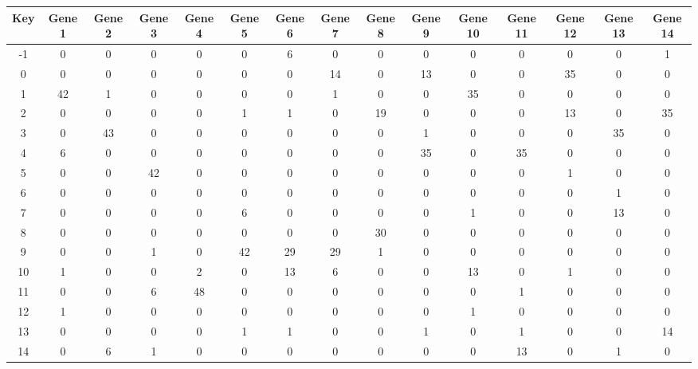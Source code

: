 \begin{tabular}{|c|c|c|c|c|c|c|c|c|c|c|c|c|c|c|}
\hline
Key & Gene 1 & Gene 2 & Gene 3 & Gene 4 & Gene 5 & Gene 6 & Gene 7 & Gene 8 & Gene 9 & Gene 10 & Gene 11 & Gene 12 & Gene 13 & Gene 14 \\
\hline
-1 & 0 & 0 & 0 & 0 & 0 & 6 & 0 & 0 & 0 & 0 & 0 & 0 & 0 & 1 \\
0 & 0 & 0 & 0 & 0 & 0 & 0 & 14 & 0 & 13 & 0 & 0 & 35 & 0 & 0 \\
1 & 42 & 1 & 0 & 0 & 0 & 0 & 1 & 0 & 0 & 35 & 0 & 0 & 0 & 0 \\
2 & 0 & 0 & 0 & 0 & 1 & 1 & 0 & 19 & 0 & 0 & 0 & 13 & 0 & 35 \\
3 & 0 & 43 & 0 & 0 & 0 & 0 & 0 & 0 & 1 & 0 & 0 & 0 & 35 & 0 \\
4 & 6 & 0 & 0 & 0 & 0 & 0 & 0 & 0 & 35 & 0 & 35 & 0 & 0 & 0 \\
5 & 0 & 0 & 42 & 0 & 0 & 0 & 0 & 0 & 0 & 0 & 0 & 1 & 0 & 0 \\
6 & 0 & 0 & 0 & 0 & 0 & 0 & 0 & 0 & 0 & 0 & 0 & 0 & 1 & 0 \\
7 & 0 & 0 & 0 & 0 & 6 & 0 & 0 & 0 & 0 & 1 & 0 & 0 & 13 & 0 \\
8 & 0 & 0 & 0 & 0 & 0 & 0 & 0 & 30 & 0 & 0 & 0 & 0 & 0 & 0 \\
9 & 0 & 0 & 1 & 0 & 42 & 29 & 29 & 1 & 0 & 0 & 0 & 0 & 0 & 0 \\
10 & 1 & 0 & 0 & 2 & 0 & 13 & 6 & 0 & 0 & 13 & 0 & 1 & 0 & 0 \\
11 & 0 & 0 & 6 & 48 & 0 & 0 & 0 & 0 & 0 & 0 & 1 & 0 & 0 & 0 \\
12 & 1 & 0 & 0 & 0 & 0 & 0 & 0 & 0 & 0 & 1 & 0 & 0 & 0 & 0 \\
13 & 0 & 0 & 0 & 0 & 1 & 1 & 0 & 0 & 1 & 0 & 1 & 0 & 0 & 14 \\
14 & 0 & 6 & 1 & 0 & 0 & 0 & 0 & 0 & 0 & 0 & 13 & 0 & 1 & 0 \\
\hline
\end{tabular}